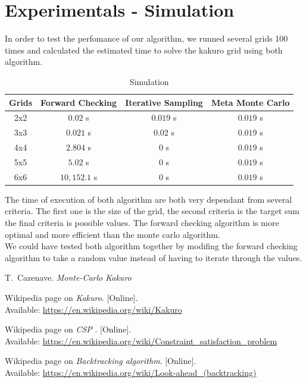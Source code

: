 \documentclass[journal, a4paper]{IEEEtran}
\begin{document}
\section{Experimentals - Simulation}
In order to test the perfomance of our algorithm, we runned several grids 100 times and calculated the estimated time to solve the kakuro grid using both algorithm. 

    \begin{table}[!hbt]
        \begin{center}
        \caption{Simulation}
        \label{tab:simParameters}
        \begin{tabular}{|c|c|c|c|}
            \hline
           Grids & Forward Checking &  Iterative Sampling & Meta Monte Carlo \\
            \hline
           2x2 & $0.02$ s  &  $ 0.019 $ s   &  $ 0.019 $ s  \\
            \hline
           3x3 & $0.021$ s  &  $ 0.02 $ s &  $ 0.019 $ s    \\
            \hline
           4x4 & $ 2.804  $ s  &  $ 0 $ s  &  $ 0.019 $ s   \\
            \hline
           5x5 & $5.02$ s  &  $ 0 $ s &  $ 0.019 $ s    \\
            \hline
           6x6 & $ 10,152.1$ s  &  $ 0 $ s  &  $ 0.019 $ s   \\
            \hline
        \end{tabular}
        \end{center}
    \end{table}
The time of execution of both algorithm are both very dependant from several criteria. The first one is the size of the grid, the second criteria is the target sum the final criteria is possible values.
The forward checking algorithm is more optimal and more efficient than the monte carlo algorithm. \\
We could have tested both algorithm together by modifing the forward checking algorithm to take a random value instead of having to iterate through the values.

\begin{thebibliography}{5}
    T.~Cazenave. {\em Monte-Carlo Kakuro}

   Wikipedia page on {\em Kakuro}. [Online]. \\ Available:  \url{ https://en.wikipedia.org/wiki/Kakuro}

   Wikipedia page on {\em CSP }. [Online]. \\ Available:  \url{https://en.wikipedia.org/wiki/Constraint_satisfaction_problem}

   Wikipedia page on {\em Backtracking algorithm}. [Online]. \\ Available:  \url{https://en.wikipedia.org/wiki/Look-ahead_(backtracking)}

\end{thebibliography}
\end{document}
